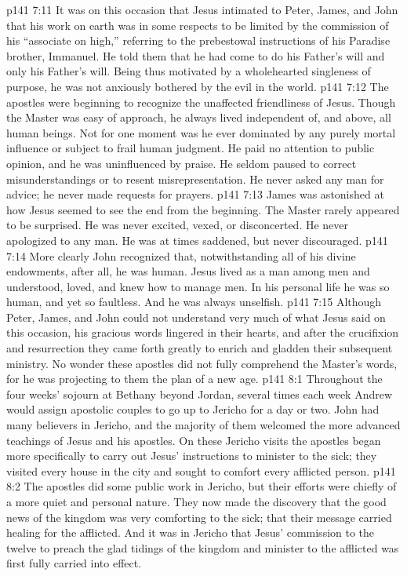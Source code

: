 \vs p141 7:11 It was on this occasion that Jesus intimated to Peter, James, and John that his work on earth was in some respects to be limited by the commission of his “associate on high,” referring to the prebestowal instructions of his Paradise brother, Immanuel. He told them that he had come to do his Father’s will and only his Father’s will. Being thus motivated by a wholehearted singleness of purpose, he was not anxiously bothered by the evil in the world.
\vs p141 7:12 The apostles were beginning to recognize the unaffected friendliness of Jesus. Though the Master was easy of approach, he always lived independent of, and above, all human beings. Not for one moment was he ever dominated by any purely mortal influence or subject to frail human judgment. He paid no attention to public opinion, and he was uninfluenced by praise. He seldom paused to correct misunderstandings or to resent misrepresentation. He never asked any man for advice; he never made requests for prayers.
\vs p141 7:13 James was astonished at how Jesus seemed to see the end from the beginning. The Master rarely appeared to be surprised. He was never excited, vexed, or disconcerted. He never apologized to any man. He was at times saddened, but never discouraged.
\vs p141 7:14 More clearly John recognized that, notwithstanding all of his divine endowments, after all, he was human. Jesus lived as a man among men and understood, loved, and knew how to manage men. In his personal life he was so human, and yet so faultless. And he was always unselfish.
\vs p141 7:15 Although Peter, James, and John could not understand very much of what Jesus said on this occasion, his gracious words lingered in their hearts, and after the crucifixion and resurrection they came forth greatly to enrich and gladden their subsequent ministry. No wonder these apostles did not fully comprehend the Master’s words, for he was projecting to them the plan of a new age.
\vs p141 8:1 Throughout the four weeks’ sojourn at Bethany beyond Jordan, several times each week Andrew would assign apostolic couples to go up to Jericho for a day or two. John had many believers in Jericho, and the majority of them welcomed the more advanced teachings of Jesus and his apostles. On these Jericho visits the apostles began more specifically to carry out Jesus’ instructions to minister to the sick; they visited every house in the city and sought to comfort every afflicted person.
\vs p141 8:2 The apostles did some public work in Jericho, but their efforts were chiefly of a more quiet and personal nature. They now made the discovery that the good news of the kingdom was very comforting to the sick; that their message carried healing for the afflicted. And it was in Jericho that Jesus’ commission to the twelve to preach the glad tidings of the kingdom and minister to the afflicted was first fully carried into effect.
